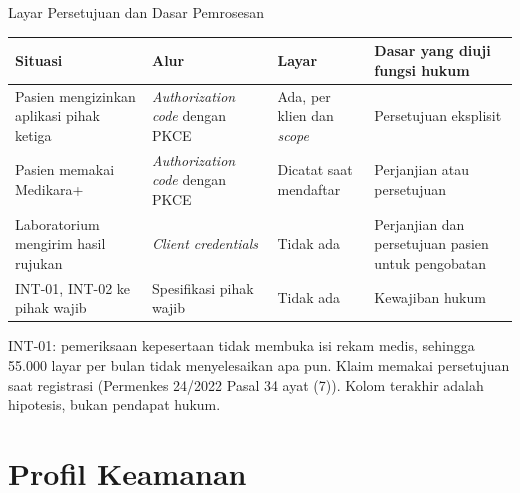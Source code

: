 \documentclass[aspectratio=169, table, 12pt]{beamer}
\begin{document}
\begin{frame}{{\Large Layar Persetujuan dan Dasar Pemrosesan}}
  \footnotesize
  \begin{tabularx}{\textwidth}{>{\raggedright\arraybackslash}X
      >{\raggedright\arraybackslash}p{2.9cm} >{\raggedright\arraybackslash}p{2.0cm} >{\raggedright\arraybackslash}X}
    \hline
    \textbf{Situasi} & \textbf{Alur} & \textbf{Layar} & \textbf{Dasar yang diuji fungsi hukum} \\ \hline
    Pasien mengizinkan aplikasi pihak ketiga & \textit{Authorization code} dengan PKCE & Ada, per klien dan \textit{scope} & Persetujuan eksplisit \\ \hline
    Pasien memakai Medikara+ & \textit{Authorization code} dengan PKCE & Dicatat saat mendaftar & Perjanjian atau persetujuan \\ \hline
    Laboratorium mengirim hasil rujukan & \textit{Client credentials} & Tidak ada & Perjanjian dan persetujuan pasien untuk pengobatan \\ \hline
    INT-01, INT-02 ke pihak wajib & Spesifikasi pihak wajib & Tidak ada & Kewajiban hukum \\ \hline
  \end{tabularx}

  \vspace{6pt}
  \small INT-01: pemeriksaan kepesertaan tidak membuka isi rekam medis, sehingga 55.000 layar per bulan tidak menyelesaikan apa pun. Klaim memakai persetujuan saat registrasi (Permenkes 24/2022 Pasal 34 ayat (7)). Kolom terakhir adalah hipotesis, bukan pendapat hukum.
\end{frame}

\section{Profil Keamanan}
\end{document}
